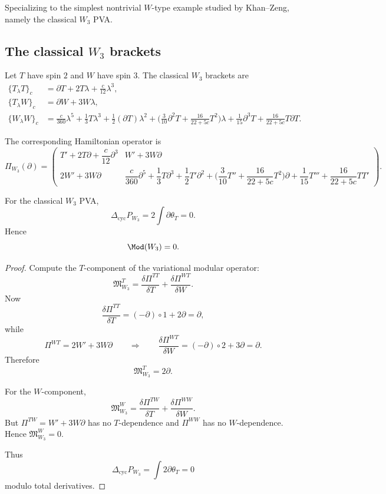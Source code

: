Specializing to the simplest nontrivial $W$-type example studied by Khan--Zeng,
namely the classical $W_3$ PVA.

\subsection{The classical $W_3$ brackets}

Let $T$ have spin $2$ and $W$ have spin $3$. The classical $W_3$ brackets are
\cite{KZ25}
\begin{align}
\{T_\lambda T\}_c
&=
\partial T+2T\lambda+\frac{c}{12}\lambda^3,
\\[4pt]
\{T_\lambda W\}_c
&=
\partial W+3W\lambda,
\\[4pt]
\{W_\lambda W\}_c
&=
\frac{c}{360}\lambda^5
+\frac13 T\lambda^3
+\frac12(\partial T)\lambda^2
+\Big(\frac3{10}\partial^2T+\frac{16}{22+5c}T^2\Big)\lambda
+\frac1{15}\partial^3T
+\frac{16}{22+5c}T\partial T.
\end{align}

The corresponding Hamiltonian operator is
\[
\Pi_{W_3}(\partial)=
\begin{pmatrix}
T'+2T\partial+\dfrac c{12}\partial^3
&
W'+3W\partial
\\[2mm]
2W'+3W\partial
&
\dfrac c{360}\partial^5
+\dfrac13 T\partial^3
+\dfrac12 T'\partial^2
+\Big(\dfrac{3}{10}T''+\dfrac{16}{22+5c}T^2\Big)\partial
+\dfrac1{15}T'''
+\dfrac{16}{22+5c}TT'
\end{pmatrix}.
\]

\begin{theorem}\label{thm:W3mod0}
For the classical $W_3$ PVA,
\[
\Delta_{\mathrm{cyc}}P_{W_3}=2\int \partial\theta_T=0.
\]
Hence
\[
\Mod(W_3)=0.
\]
\end{theorem}

\begin{proof}
Compute the $T$-component of the variational modular operator:
\[
\mathfrak M_{W_3}^T
=
\frac{\delta \Pi^{TT}}{\delta T}
+
\frac{\delta \Pi^{WT}}{\delta W}.
\]
Now
\[
\frac{\delta \Pi^{TT}}{\delta T}=(-\partial)\circ 1+2\partial=\partial,
\]
while
\[
\Pi^{WT}=2W'+3W\partial
\qquad\Longrightarrow\qquad
\frac{\delta \Pi^{WT}}{\delta W}=(-\partial)\circ 2 + 3\partial=\partial.
\]
Therefore
\[
\mathfrak M_{W_3}^T=2\partial.
\]

For the $W$-component,
\[
\mathfrak M_{W_3}^W
=
\frac{\delta \Pi^{TW}}{\delta T}
+
\frac{\delta \Pi^{WW}}{\delta W}.
\]
But $\Pi^{TW}=W'+3W\partial$ has no $T$-dependence and $\Pi^{WW}$ has no $W$-dependence.
Hence $\mathfrak M_{W_3}^W=0$.

Thus
\[
\Delta_{\mathrm{cyc}}P_{W_3}=\int 2\partial\theta_T=0
\]
modulo total derivatives.
\end{proof}


